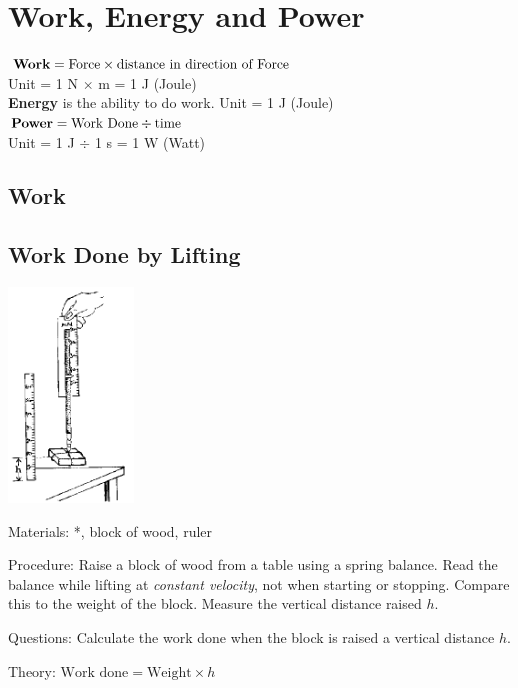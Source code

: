 \section{Work, Energy and Power}
\begin{center}
$\text{\textbf{Work}} = \text{Force} \times \text{distance in direction of Force} $\\
Unit = 1 N $\times$ m = 1 J (Joule)\\
\textbf{Energy} is the ability to do work. Unit = 1 J (Joule)\\
$\text{\textbf{Power}} = \text{Work Done} \div \text{time} $\\
Unit = 1 J $\div$ 1 s = 1 W (Watt)
\end{center}

\begin{multicols}{2}


\section*{Work}


\subsection{Work Done by Lifting}

\begin{center}
\includegraphics[width=0.25\textwidth]{./img/source/work-lifting.png}
\end{center}

\begin{description*}
\item[Materials:]{*, block of wood, ruler}
\item[Procedure:]{Raise a block of wood from a table using a spring balance. Read the balance while lifting at \emph{constant velocity}, not when starting or stopping. Compare this to the weight of the block. Measure the vertical distance raised $h$. }
\item[Questions:]{Calculate the work done when the block is raised a vertical distance $h$.}
\item[Theory:]{$\text{Work done} = \text{Weight} \times h$}
\end{description*}


\end{multicols}
